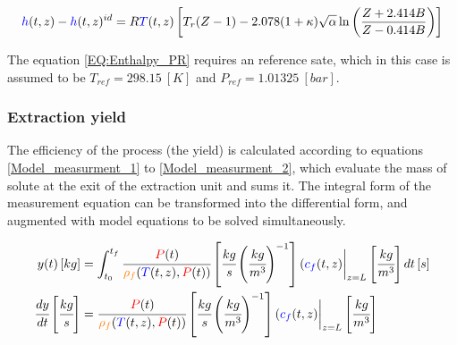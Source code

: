 \documentclass[../Article_Model_Parameters.tex]{subfiles}
\begin{document}
			{\footnotesize
				\begin{equation}
					{\color{blue}h}(t,z)-{\color{blue}h}(t,z)^{id}=R{\color{blue}T}(t,z) \left[T_{r}(Z-1)-2.078(1+\kappa ){\sqrt {\alpha }}\ln \left({\frac {Z+2.414B}{Z-0.414B}}\right)\right]
					\label{EQ:Enthalpy_PR}
				\end{equation}
			}
		
			The equation \ref{EQ:Enthalpy_PR} requires an reference sate, which in this case is assumed to be $T_{ref}=298.15~[K]$ and $P_{ref}=1.01325~[bar]$.
	
	
  
		\subsubsection{Extraction yield} \label{CH: Yield} 
			
		The efficiency of the process (the yield) is calculated according to equations \ref{Model_measurment_1} to \ref{Model_measurment_2}, which evaluate the mass of solute at the exit of the extraction unit and sums it. The integral form of the measurement equation can be transformed into the differential form, and augmented with model equations to be solved simultaneously.
			
		{\footnotesize
			\begin{align} 
				\label{Model_measurment_1}
				y(t) \left[ kg \right] &= \int_{t_0}^{t_f} \cfrac{{\color{red}P}(t)}{{\color{orange}\rho_f}({\color{blue}T}(t,z),{\color{red}P}(t))} \left[ \cfrac{kg}{s} \left( \cfrac{kg}{m^3} \right)^{-1} \right] ({\color{blue}c_f}(t,z) \biggr\rvert_{z=L} \left[ \cfrac{kg}{m^3} \right] dt \left[ s \right] 	\\
				\cfrac{dy}{dt} \left[ \cfrac{kg}{s} \right] &= \cfrac{{\color{red}P}(t)}{{\color{orange}\rho_f}({\color{blue}T}(t,z),{\color{red}P}(t))} \left[ \cfrac{kg}{s} \left( \cfrac{kg}{m^3} \right)^{-1} \right] ({\color{blue}c_f}(t,z) \biggr\rvert_{z=L} \left[ \cfrac{kg}{m^3} \right]
                \label{Model_measurment_2}
		\end{align}	}
			
\end{document}
